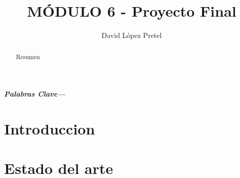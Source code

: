 \documentclass{article}
\providecommand{\keywords}[1]{\textbf{\textit{Palabras Clave---}} #1}
\begin{document}
	\title{MÓDULO 6 - Proyecto Final}
	\author{David López Pretel}
	\maketitle
	\newpage
	\tableofcontents
	\newpage
	\begin{abstract}
		Resumen
	\end{abstract}

	\keywords{}
	
	\section{Introduccion}
	\section{Estado del arte}
	
	
	
\end{document}
